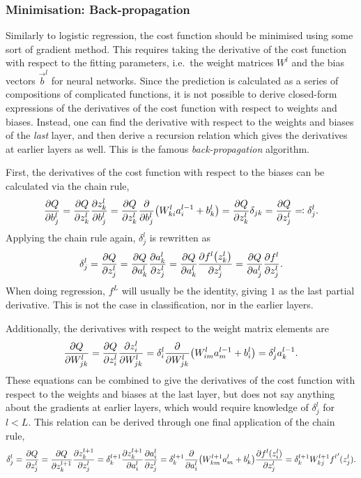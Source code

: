 \documentclass[11pt,british,a4paper]{article}
\numberwithin{equation}{section}
\begin{document}
\subsubsection{Minimisation: Back-propagation}
Similarly to logistic regression, the cost function should be minimised using some sort of gradient method.
This requires taking the derivative of the cost function with respect to the fitting parameters, i.e.\ the weight matrices \(W^l\) and the bias vectors \(\vec{b}^l\) for neural networks.
Since the prediction is calculated as a series of compositions of complicated functions, it is not possible to derive closed-form expressions of the derivatives of the cost function with respect to weights and biases.
Instead, one can find the derivative with respect to the weights and biases of the \emph{last} layer, and then derive a recursion relation which gives the derivatives at earlier layers as well. This is the famous \emph{back-propagation} algorithm.

First, the derivatives of the cost function with respect to the biases can be calculated via the chain rule,
\begin{equation}
    \pdv{Q}{b_j^l} = \pdv{Q}{z_k^l}\pdv{z_k^l}{b_j^l} = \pdv{Q}{z_k^l}\pdv{b_j^l}(W_{ki}^l a_i^{l-1} + b_k^l) = \pdv{Q}{z_k^l}\delta_{jk}
    = \pdv{Q}{z_j^l} \eqqcolon \delta_j^l.
\end{equation}
Applying the chain rule again, \(\delta_j^l\) is rewritten as
\begin{equation}
    \delta_j^l = \pdv{Q}{z_j^l} = \pdv{Q}{a_k^l}\pdv{a_k^l}{z_j^l} = \pdv{Q}{a_k^l}\pdv{f^l\qty(z_k^l)}{z_j^l}
               = \pdv{Q}{a_j^l}\pdv{f^l}{z_j^l}.
\end{equation}
When doing regression, \(f^L\) will usually be the identity, giving \(1\) as the last partial derivative. This is not the case in classification, nor in the earlier layers.

Additionally, the derivatives with respect to the weight matrix elements are
\begin{equation}
    \pdv{Q}{W_{jk}^l} = \pdv{Q}{z_i^l}\pdv{z_i^l}{W_{jk}^l} = \delta_i^l \pdv{W_{jk}^l}\qty(W_{im}^l a_m^{l-1} + b_i^l)
                      = \delta_j^l a_k^{l-1}.
\end{equation}
These equations can be combined to give the derivatives of the cost function with respect to the weights and biases at the last layer, but does not say anything about the gradients at earlier layers, which would require knowledge of \(\delta_j^l\) for \(l<L\).
This relation can be derived through one final application of the chain rule,
\begin{equation}
    \delta_j^l = \pdv{Q}{z_j^l} = \pdv{Q}{z_k^{l+1}}\pdv{z_k^{l+1}}{z_j^l}
               = \delta_k^{l+1} \pdv{z_k^{l+1}}{a_i^l}\pdv{a_i^l}{z_j^{l}}
               = \delta_k^{l+1} \pdv{a_i^l}\qty(W_{km}^{l+1}a_m^l + b_k^l) \pdv{f^l(z_i^l)}{z_j^{l}}
               = \delta_k^{l+1} W_{kj}^{l+1} {f^l} '(z_j^l).
\end{equation}
\end{document}
